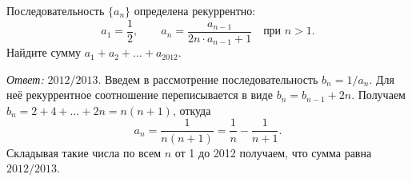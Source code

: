 Последовательность $\{ a_n \}$ определена рекуррентно:
\[
    a_1 = \frac{1}{2}
,\qquad
    a_n = \frac{a_{n - 1}}{2 n \cdot a_{n - 1} + 1}
    \quad\text{при $n > 1$}
.\]
Найдите сумму $a_1 + a_2 + \ldots + a_{2012}$.

\solution
\emph{Ответ:} $2012 / 2013$.
Введем в рассмотрение последовательность $b_n = 1 / a_n$.
Для неё рекуррентное соотношение переписывается в виде $b_n = b_{n - 1} + 2 n$.
Получаем
$b_n = 2 + 4 + \ldots + 2 n = n (n + 1)$,
откуда
\[a_n = \frac{1}{n (n + 1)} = \frac{1}{n} - \frac{1}{n + 1}.\]
Складывая такие числа по всем $n$ от 1 до 2012 получаем, что сумма равна
$2012 / 2013$.

